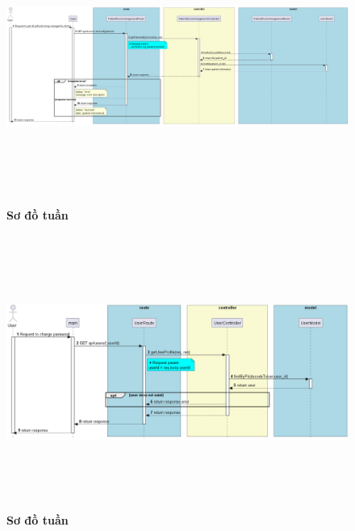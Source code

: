 \begin{figure}[H]
  \centering
  \includegraphics[width=16cm,height=9cm]{Images/server/sequence/server/getPatientsByDoctor.png}
  \caption[Sơ đồ tuần tự ]{\bfseries \fontsize{12pt}{0pt}
  \selectfont Sơ đồ tuần }
  \label{hinh21} %
\end{figure}

\begin{figure}[H]
  \centering
  \includegraphics[width=16cm,height=9cm]{Images/server/sequence/server/getUserById.png}
  \caption[Sơ đồ tuần tự ]{\bfseries \fontsize{12pt}{0pt}
  \selectfont Sơ đồ tuần }
  \label{hinh21} %
\end{figure}

